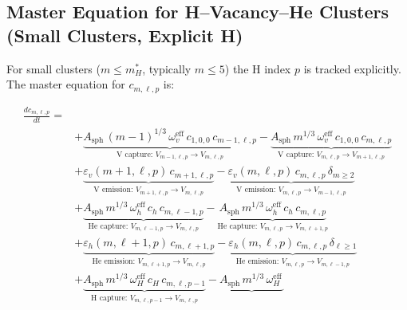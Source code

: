 \documentclass[pdflatex,sn-basic]{sn-jnl} %
\begin{document}
\subsection{Master Equation for H--Vacancy--He Clusters (Small Clusters,
            Explicit H)}
\label{sec:ME_HVHe}

For small clusters ($m \leq m_H^*$, typically $m \leq 5$) the H index
$p$ is tracked explicitly.  The master equation for $c_{m,\ell,p}$ is:

\begin{equation}\label{eq:ME_HVHe}
\boxed{
\begin{split}
\frac{dc_{m,\ell,p}}{dt} = {} &
    \\
    &+ \underbrace{
       A_{\mathrm{sph}}\,(m{-}1)^{1/3}\,\omega_v^{\mathrm{eff}}\,
       c_{1,0,0}\,c_{m-1,\ell,p}
       }_{\text{V capture: }V_{m-1,\ell,p}\to V_{m,\ell,p}}
     - \underbrace{
       A_{\mathrm{sph}}\,m^{1/3}\,\omega_v^{\mathrm{eff}}\,
       c_{1,0,0}\,c_{m,\ell,p}
       }_{\text{V capture: }V_{m,\ell,p}\to V_{m+1,\ell,p}}
    \\[4pt]
    &+ \underbrace{
       \varepsilon_v(m{+}1,\ell,p)\,c_{m+1,\ell,p}
       }_{\text{V emission: }V_{m+1,\ell,p}\to V_{m,\ell,p}}
     - \underbrace{
       \varepsilon_v(m,\ell,p)\,c_{m,\ell,p}\,\delta_{m\geq 2}
       }_{\text{V emission: }V_{m,\ell,p}\to V_{m-1,\ell,p}}
    \\[4pt]
    &+ \underbrace{
       A_{\mathrm{sph}}\,m^{1/3}\,\omega_h^{\mathrm{eff}}\,
       c_h\,c_{m,\ell-1,p}
       }_{\text{He capture: }V_{m,\ell-1,p}\to V_{m,\ell,p}}
     - \underbrace{
       A_{\mathrm{sph}}\,m^{1/3}\,\omega_h^{\mathrm{eff}}\,
       c_h\,c_{m,\ell,p}
       }_{\text{He capture: }V_{m,\ell,p}\to V_{m,\ell+1,p}}
    \\[4pt]
    &+ \underbrace{
       \varepsilon_h(m,\ell{+}1,p)\,c_{m,\ell+1,p}
       }_{\text{He emission: }V_{m,\ell+1,p}\to V_{m,\ell,p}}
     - \underbrace{
       \varepsilon_h(m,\ell,p)\,c_{m,\ell,p}\,\delta_{\ell\geq 1}
       }_{\text{He emission: }V_{m,\ell,p}\to V_{m,\ell-1,p}}
    \\[4pt]
    &+ \underbrace{
       A_{\mathrm{sph}}\,m^{1/3}\,\omega_H^{\mathrm{eff}}\,
       c_H\,c_{m,\ell,p-1}
       }_{\text{H capture: }V_{m,\ell,p-1}\to V_{m,\ell,p}}
     - \underbrace{
       A_{\mathrm{sph}}\,m^{1/3}\,\omega_H^{\mathrm{eff}}\,
}
\end{split}}
\end{equation}
\end{document}
